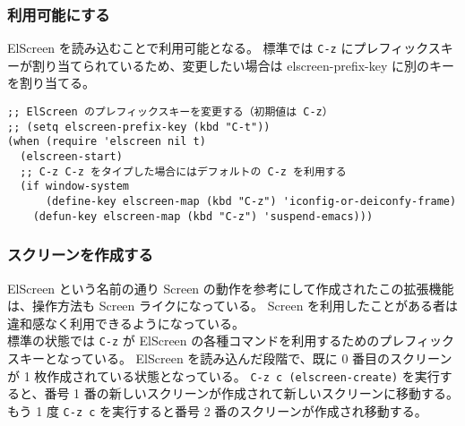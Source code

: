 \subsubsection{利用可能にする}
ElScreen を読み込むことで利用可能となる。
標準では \texttt{C-z} にプレフィックスキーが割り当てられているため、変更したい場合は elscreen-prefix-key に別のキーを割り当てる。
\begin{mdframed}[roundcorner=0.50zw,leftmargin=3.00zw,rightmargin=3.00zw,skipabove=0.40zw,skipbelow=0.40zw,innertopmargin=4.00pt,innerbottommargin=4.00pt,innerleftmargin=5.00pt,innerrightmargin=5.00pt,linecolor=gray!020,linewidth=0.50pt,backgroundcolor=gray!20]
\begin{verbatim}
;; ElScreen のプレフィックスキーを変更する（初期値は C-z）
;; (setq elscreen-prefix-key (kbd "C-t"))
(when (require 'elscreen nil t)
  (elscreen-start)
  ;; C-z C-z をタイプした場合にはデフォルトの C-z を利用する
  (if window-system
      (define-key elscreen-map (kbd "C-z") 'iconfig-or-deiconfy-frame)
    (defun-key elscreen-map (kbd "C-z") 'suspend-emacs)))
\end{verbatim}
\end{mdframed}
\subsubsection{スクリーンを作成する}
ElScreen という名前の通り Screen の動作を参考にして作成されたこの拡張機能は、操作方法も Screen ライクになっている。
Screen を利用したことがある者は違和感なく利用できるようになっている。\\

標準の状態では \texttt{C-z} が ElScreen の各種コマンドを利用するためのプレフィックスキーとなっている。
ElScreen を読み込んだ段階で、既に 0 番目のスクリーンが 1 枚作成されている状態となっている。
\texttt{C-z c (elscreen-create)} を実行すると、番号 1 番の新しいスクリーンが作成されて新しいスクリーンに移動する。
もう 1 度 \texttt{C-z c} を実行すると番号 2 番のスクリーンが作成され移動する。
